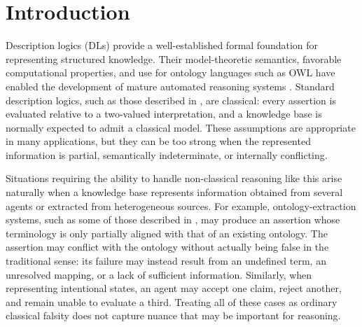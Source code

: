 \documentclass[letterpaper]{article} %
\theoremstyle{definition}
\theoremstyle{definition}
\theoremstyle{definition}
\theoremstyle{definition}
\theoremstyle{definition}
\begin{document}
\section{Introduction}


Description logics (DLs) provide a well-established formal foundation for representing structured knowledge. Their model-theoretic semantics, favorable computational properties, and use for ontology languages such as OWL have enabled the development of mature automated reasoning systems \cite{DBLP:conf/ore/MatentzogluLHSP15,DBLP:series/faia/SinghBM23}. Standard description logics, such as those described in \cite{DBLP:conf/dlog/2003handbook}, are classical: every assertion is evaluated relative to a two-valued interpretation, and a knowledge base is normally expected to admit a classical model. These assumptions are appropriate in many applications, but they can be too strong when the represented information is partial, semantically indeterminate, or internally conflicting.

Situations requiring the ability to handle non-classical reasoning like this arise naturally when a knowledge base represents information obtained from several agents or extracted from heterogeneous sources. For example, ontology-extraction systems, such as some of those described in \cite{DBLP:journals/csr/ArmaryVLN25}, may produce an assertion whose terminology is only partially aligned with that of an existing ontology. The assertion may conflict with the ontology without actually being false in the traditional sense: its failure may instead result from an undefined term, an unresolved mapping, or a lack of sufficient information. Similarly, when representing intentional states, an agent may accept one claim, reject another, and remain unable to evaluate a third. Treating all of these cases as ordinary classical falsity does not capture nuance that may be important for reasoning.
\end{document}
